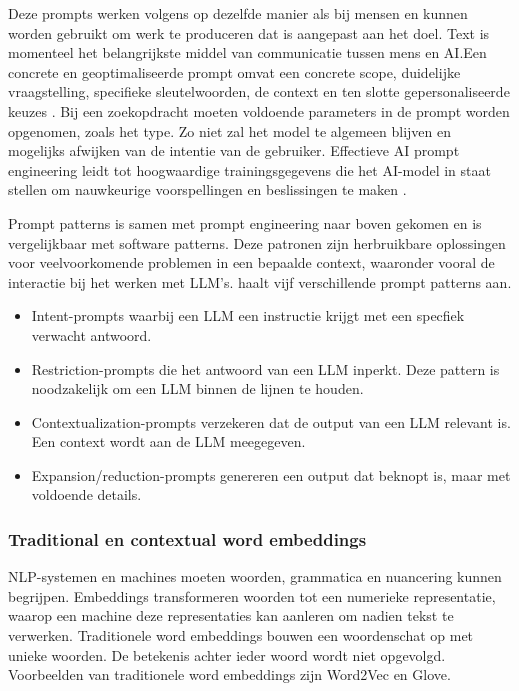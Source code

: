 Deze prompts werken volgens \textcite{Liu2020} op dezelfde manier als bij mensen en kunnen worden gebruikt om werk te produceren dat is aangepast aan het doel. Text is momenteel het belangrijkste middel van communicatie tussen mens en AI.Een concrete en geoptimaliseerde prompt omvat een concrete scope, duidelijke vraagstelling, specifieke sleutelwoorden, de context en ten slotte gepersonaliseerde keuzes \autocite{McFarland2023}. Bij een zoekopdracht moeten voldoende parameters in de prompt worden opgenomen, zoals het type. Zo niet zal het model te algemeen blijven en mogelijks afwijken van de intentie van de gebruiker. Effectieve AI prompt engineering leidt tot hoogwaardige trainingsgegevens die het AI-model in staat stellen om nauwkeurige voorspellingen en beslissingen te maken \autocite{Liu2020}.

Prompt patterns is samen met prompt engineering naar boven gekomen en is vergelijkbaar met software patterns. Deze patronen zijn herbruikbare oplossingen voor veelvoorkomende problemen in een bepaalde context, waaronder vooral de interactie bij het werken met LLM's. \textcite{White2023} haalt vijf verschillende prompt patterns aan.

\begin{itemize}
\item	Intent-prompts waarbij een LLM een instructie krijgt met een specfiek verwacht antwoord.
\item	Restriction-prompts die het antwoord van een LLM inperkt. Deze pattern is noodzakelijk om een LLM binnen de lijnen te houden.
\item 	Contextualization-prompts verzekeren dat de output van een LLM relevant is. Een context wordt aan de LLM meegegeven.
\item	Expansion/reduction-prompts genereren een output dat beknopt is, maar met voldoende details. 
\end{itemize}

\subsubsection{Traditional en contextual word embeddings}

NLP-systemen en machines moeten woorden, grammatica en nuancering kunnen begrijpen. Embeddings transformeren woorden tot een numerieke representatie, waarop een machine deze representaties kan aanleren om nadien tekst te verwerken. Traditionele word embeddings bouwen een woordenschat op met unieke woorden. De betekenis achter ieder woord wordt niet opgevolgd. Voorbeelden van traditionele word embeddings zijn Word2Vec en Glove.

